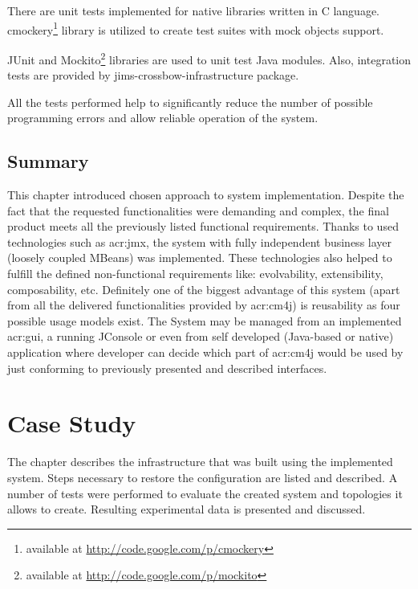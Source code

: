 \documentclass[11pt,openany]{book}
\begin{document}
      There are unit tests implemented for native libraries written in C language. cmockery\footnote{available at
      \url{http://code.google.com/p/cmockery}} library is utilized to create test suites with mock objects support.

      JUnit and Mockito\footnote{available at \url{http://code.google.com/p/mockito}} libraries are used to unit test
      Java modules. Also, integration tests are provided by jims-crossbow-infrastructure package.

      All the tests performed help to significantly reduce the number of possible programming errors and allow reliable
      operation of the system.
      

    \section*{Summary}
    \label{sec:impl:summary}

      This chapter introduced chosen approach to system implementation. Despite the fact that the requested
      functionalities were demanding and complex, the final product meets all the previously listed functional
      requirements. Thanks to used technologies such as \gls{acr:jmx}, the system with fully independent business layer
      (loosely coupled MBeans) was implemented. These technologies also helped to fulfill the defined non-functional
      requirements like: evolvability, extensibility, composability, etc. Definitely one of the biggest advantage of
      this system (apart from all the delivered functionalities provided by \gls{acr:cm4j}) is reusability as four
      possible usage models exist. The System may be managed from an implemented \gls{acr:gui}, a running JConsole or
      even from self developed (Java-based or native) application where developer can decide which part of
      \gls{acr:cm4j} would be used by just conforming to previously presented and described interfaces.


  \chapter{Case Study}
  \label{chap:cs}

    The chapter describes the infrastructure that was built using the implemented system. Steps necessary to restore the
    configuration are listed and described. A number of tests were performed to evaluate the created system and
    topologies it allows to create. Resulting experimental data is presented and discussed.
\end{document}

